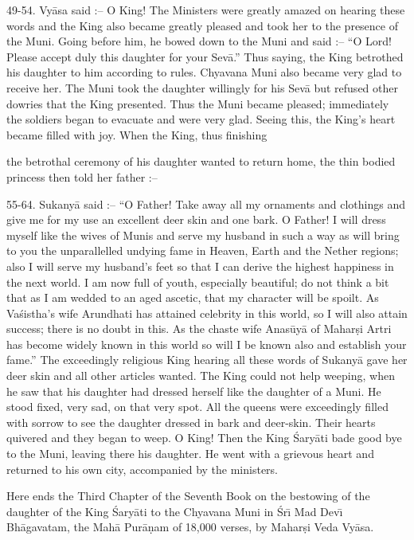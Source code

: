 49-54. Vy\=asa said :-- O King! The Ministers were greatly amazed on hearing these words and the King also became greatly pleased and took her to the presence of the Muni. Going before him, he bowed down to the Muni and said :-- ``O Lord! Please accept duly this daughter for your Sev\=a.'' Thus saying, the King betrothed his daughter to him according to rules. Chyavana Muni also became very glad to receive her. The Muni took the daughter willingly for his Sev\=a but refused other dowries that the King presented. Thus the Muni became pleased; immediately the soldiers began to evacuate and were very glad. Seeing this, the King's heart became filled with joy. When the King, thus finishing

the betrothal ceremony of his daughter wanted to return home, the thin bodied princess then told her father :--

55-64. Sukany\=a said :-- ``O Father! Take away all my ornaments and clothings and give me for my use an excellent deer skin and one bark. O Father! I will dress myself like the wives of Munis and serve my husband in such a way as will bring to you the unparallelled undying fame in Heaven, Earth and the Nether regions; also I will serve my husband's feet so that I can derive the highest happiness in the next world. I am now full of youth, especially beautiful; do not think a bit that as I am wedded to an aged ascetic, that my character will be spoilt. As Va\'sistha's wife Arundhati has attained celebrity in this world, so I will also attain success; there is no doubt in this. As the chaste wife Anas\=uy\=a of Mahar\d{s}i Artri has become widely known in this world so will I be known also and establish your fame.'' The exceedingly religious King hearing all these words of Sukany\=a gave her deer skin and all other articles wanted. The King could not help weeping, when he saw that his daughter had dressed herself like the daughter of a Muni. He stood fixed, very sad, on that very spot. All the queens were exceedingly filled with sorrow to see the daughter dressed in bark and deer-skin. Their hearts quivered and they began to weep. O King! Then the King \'Sary\=ati bade good bye to the Muni, leaving there his daughter. He went with a grievous heart and returned to his own city, accompanied by the ministers.

Here ends the Third Chapter of the Seventh Book on the bestowing of the daughter of the King \'Sary\=ati to the Chyavana Muni in \'Sr\={\i} Mad Dev\={\i} Bh\=agavatam, the Mah\=a Pur\=a\d{n}am of 18,000 verses, by Mahar\d{s}i Veda Vy\=asa.



